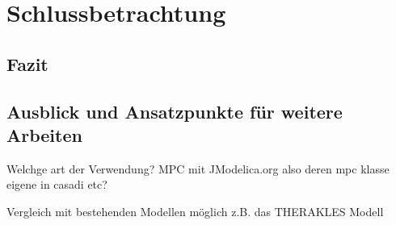 %
%

\renewcommand{\chapterheadstartvskip}{\vspace*{3cm}}

\chapter{Schlussbetrachtung}
\label{chap:schlussteil}
\renewcommand{\chapterheadstartvskip}{\vspace*{-0.5cm}}

\section{Fazit}
\label{sec:zusammenfassung}


\section{Ausblick und Ansatzpunkte für weitere Arbeiten}
\label{sec:ausblick}

Welchge art der Verwendung?
MPC mit JModelica.org also deren mpc klasse
eigene in casadi
etc?

Vergleich mit bestehenden Modellen möglich z.B. das THERAKLES Modell